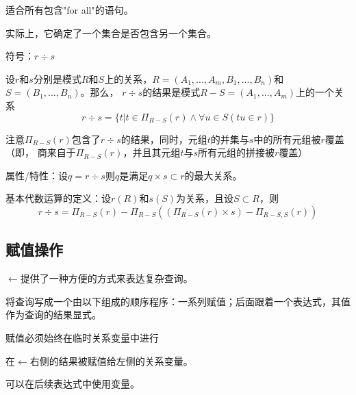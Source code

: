 适合所有包含"for all"的语句。

实际上，它确定了一个集合是否包含另一个集合。

符号：$r\div s$

设$r$和$s$分别是模式$R$和$S$上的关系，$R=(A_1,...,A_m,B_1,...,B_n)$和$S=(B_1,...,B_n)$。那么，
$r\div s$的结果是模式$R-S=(A_1,...,A_m)$上的一个关系
$$r\div s=\{t|t\in \Pi_{R-S}(r)\land \forall u\in S(tu\in r)\}$$

注意$\Pi_{R-S}(r)$包含了$r\div s$的结果，同时，元组$t$的并集与$s$中的所有元组被$r$覆盖（即，
商来自于$\Pi_{R-S}(r)$，并且其元组$t$与$s$所有元组的拼接被$r$覆盖）

属性/特性：设$q=r\div s$则$q$是满足$q\times s\subset r$的最大关系。

基本代数运算的定义：设$r(R)$和$s(S)$为关系，且设$S\subset R$，则$$r\div s=\Pi_{R-S}(r)-\Pi_{R-S}\left(\left(\Pi_{R-S}(r)\times s\right)-\Pi_{R-S,S}(r)\right)$$

\subsection{赋值操作}

$\gets$提供了一种方便的方式来表达复杂查询。

将查询写成一个由以下组成的顺序程序：一系列赋值；后面跟着一个表达式，其值作为查询的结果显式。

赋值必须始终在临时关系变量中进行

在$\gets$右侧的结果被赋值给左侧的关系变量。

可以在后续表达式中使用变量。

